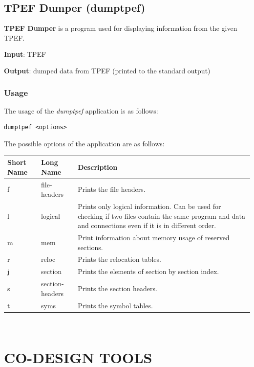 \documentclass[a4paper,twoside]{tceusermanual}
\begin{document}
\section{TPEF Dumper (dumptpef)}
\label{section:dumptpef}

\textbf{TPEF Dumper} is a program used for displaying information from the
given TPEF.

\textbf{Input}: TPEF

\textbf{Output}: dumped data from TPEF (printed to the standard output)

\subsection{Usage}

The usage of the \emph{dumptpef} application is as follows:

\begin{verbatim}
dumptpef <options>
\end{verbatim}

The possible options of the application are as follows:\\

\begin{tabular}{p{}p{}
                p{}}
\textbf{Short Name} &\textbf{Long Name} &\textbf{Description} \\
\hline
f & file-headers & Prints the file headers. \\
l & logical & Prints only logical information. Can be used for
checking if two files contain the same program and data and connections even if
it is in different order. \\
m & mem & Print information about memory usage of reserved sections. \\
r & reloc & Prints the relocation tables. \\
j & section & Prints the elements of section by section index. \\
s & section-headers & Prints the section headers. \\
t & syms & Prints the symbol tables. \\
\end{tabular}\\



\chapter{CO-DESIGN TOOLS}
\label{section:codesign}
\end{document}
